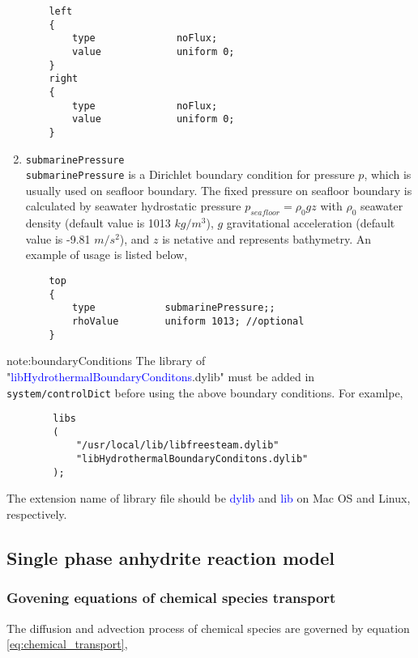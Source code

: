 \begin{enumerate}
	\begin{verbatim}
	left
	{
		type              noFlux;
		value             uniform 0;
	}
	right
	{
		type              noFlux;
		value             uniform 0;
	}
	\end{verbatim}
	
	\item \texttt{submarinePressure} \\
	\texttt{submarinePressure} is a Dirichlet boundary condition for pressure $p$, which is usually used on seafloor boundary. The fixed pressure on seafloor boundary is calculated by seawater hydrostatic pressure $p_{seafloor} = \rho_0 g z$ with $\rho_0$ seawater density (default value is 1013 $kg/m^3$),  $g$ gravitational acceleration (default value is -9.81 $m/s^2$), and $z$ is netative and represents bathymetry. An example of usage is listed below,
	
	\begin{verbatim}
	top
	{
		type            submarinePressure;;
		rhoValue        uniform 1013; //optional
	}
	\end{verbatim}
\end{enumerate}

\begin{theo}{note:boundaryConditions}
	The library of "\textcolor{blue}{libHydrothermalBoundaryConditons}.dylib" must be added in \texttt{system/controlDict} before using the above boundary conditions. For examlpe,
	\begin{verbatim}
		libs 
		( 
			"/usr/local/lib/libfreesteam.dylib" 
			"libHydrothermalBoundaryConditons.dylib"
		);
	\end{verbatim}
	The extension name of library file should be \textcolor{blue}{dylib} and \textcolor{blue}{lib} on Mac OS and Linux, respectively.
\end{theo}

\subsection{Single phase anhydrite reaction model}

\subsubsection{Govening equations of chemical species transport}
The diffusion and advection process of chemical species are governed by equation \ref{eq:chemical_transport},

